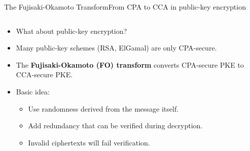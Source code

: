 \documentclass[aspectratio=169, lualatex, handout]{beamer}
\begin{document}
\begin{frame}{The Fujisaki-Okamoto Transform}{From CPA to CCA in public-key encryption}
	\begin{columns}[c]
		\begin{column}{0.6\textwidth}
			\begin{itemize}[<+->]
				\item What about public-key encryption?
				\item Many public-key schemes (RSA, ElGamal) are only CPA-secure.
				\item The \textbf{Fujisaki-Okamoto (FO) transform} converts CPA-secure PKE to CCA-secure PKE.
				\item Basic idea:
				      \begin{itemize}
					      \item Use randomness derived from the message itself.
					      \item Add redundancy that can be verified during decryption.
					      \item Invalid ciphertexts will fail verification.
				      \end{itemize}
			\end{itemize}
		\end{column}
		\begin{column}{0.4\textwidth}
		\end{column}
	\end{columns}
\end{frame}

\begin{frame}[plain]
	\titlepage
\end{frame}
\end{document}
